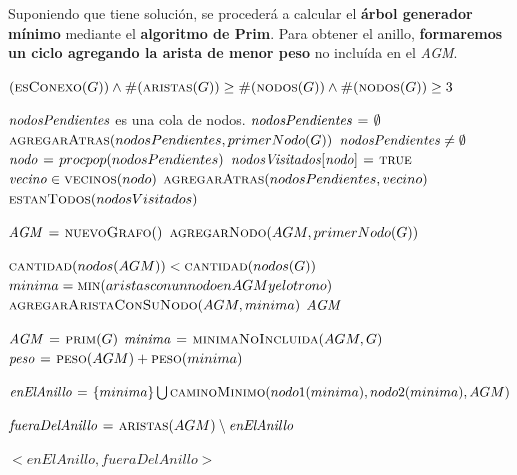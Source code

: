 Suponiendo que tiene solución, se procederá a calcular el \textbf{árbol
generador mínimo} mediante el \textbf{algoritmo de Prim}. Para obtener el
anillo, \textbf{formaremos un ciclo agregando la arista de menor peso} no
incluída en el \textit{AGM}.


\begin{codebox}
\li \Return $(\textnormal{\scshape esConexo}(G)) \land
    \textnormal{\scshape\#}(\textnormal{\scshape aristas}(G)) \geq
    \textnormal{\scshape\#}(\textnormal{\scshape nodos}(G)) \land
    \textnormal{\scshape\#}(\textnormal{\scshape nodos}(G)) \geq 3$
\end{codebox}


\vspace*{0.3cm}


\begin{codebox}
\li \Comment $\id{nodosPendientes}$ es una cola de nodos.
\li $\id{nodosPendientes} \gets \emptyset$
\li $\textnormal{\scshape agregarAtras}(nodosPendientes, primerNodo(G))$
\li \While $\id{nodosPendientes} \neq \emptyset$
\li     \Do
\li         $\id{nodo} \gets proc{pop}(nodosPendientes)$
\li         $\id{nodosVisitados[nodo]} \gets \const{true}$
            \For $\id{vecino} \in \proc{vecinos}(nodo)$
\li             \Do
                    $\textnormal{\scshape agregarAtras}(nodosPendientes, vecino)$
                \End
        \End
\li \Return $\textnormal{\scshape estanTodos}(nodosVisitados)$
\end{codebox}


\vspace*{0.3cm}


\begin{codebox}
\li $\id{AGM} \gets \proc{nuevoGrafo}()$
\li $\textnormal{\scshape agregarNodo}(AGM, primerNodo(G))$

\li \While $\textnormal{\scshape cantidad}(nodos(AGM)) < \textnormal{\scshape cantidad}(nodos(G))$
      \Do
\li     $minima = \textnormal{\scshape min}(aristas con un nodo en AGM y el otro no)$
\li     $\textnormal{\scshape agregarAristaConSuNodo}(AGM, minima)$
      \End
\li \Return $\id{AGM}$
\end{codebox}


\vspace*{0.3cm}


\begin{codebox}
\li $\id{AGM} \gets \proc{prim}(G)$
\li $\id{minima} \gets \proc{minimaNoIncluida}(AGM, G)$
\li $\id{peso} \gets \proc{peso}(AGM) + \proc{peso}(minima)$

\li $\id{enElAnillo} \gets \{minima\} \bigcup \proc{caminoMinimo}(nodo1(minima), nodo2(minima), AGM)$

\li $\id{fueraDelAnillo} \gets \proc{aristas}(AGM) \setminus \id{enElAnillo}$

\li \Return $< enElAnillo, fueraDelAnillo >$
\end{codebox}

